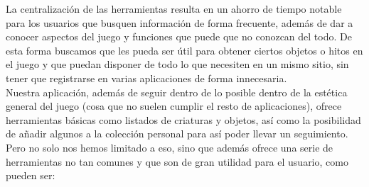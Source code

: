 La centralización de las herramientas resulta en un ahorro de tiempo notable para los usuarios que busquen información de forma frecuente, además de dar a conocer aspectos del juego y funciones que puede que no conozcan del todo. De esta forma buscamos que les pueda ser útil para obtener ciertos objetos o hitos en el juego y que puedan disponer de todo lo que necesiten en un mismo sitio, sin tener que registrarse en varias aplicaciones de forma innecesaria.\\

Nuestra aplicación, además de seguir dentro de lo posible dentro de la estética general del juego (cosa que no suelen cumplir el resto de aplicaciones), ofrece herramientas básicas como listados de criaturas y objetos, así como la posibilidad de añadir algunos a la colección personal para así poder llevar un seguimiento.\\

Pero no solo nos hemos limitado a eso, sino que además ofrece una serie de herramientas no tan comunes y que son de gran utilidad para el usuario, como pueden ser:

